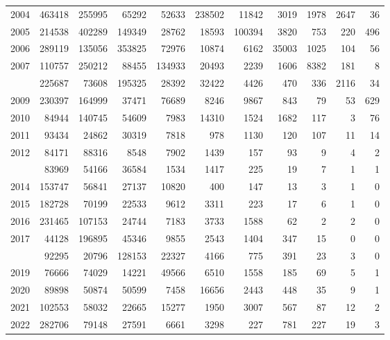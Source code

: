 \documentclass[
]{article}
\begin{document}
\begin{longtable}[t]{lrrrrrrrrrr}
2004 & 463418 & 255995 & 65292 & 52633 & 238502 & 11842 & 3019 & 1978 & 2647 & 36\\
2005 & 214538 & 402289 & 149349 & 28762 & 18593 & 100394 & 3820 & 753 & 220 & 496\\
2006 & 289119 & 135056 & 353825 & 72976 & 10874 & 6162 & 35003 & 1025 & 104 & 56\\
2007 & 110757 & 250212 & 88455 & 134933 & 20493 & 2239 & 1606 & 8382 & 181 & 8\\
\addlinespace
2008 & 225687 & 73608 & 195325 & 28392 & 32422 & 4426 & 470 & 336 & 2116 & 34\\
2009 & 230397 & 164999 & 37471 & 76689 & 8246 & 9867 & 843 & 79 & 53 & 629\\
2010 & 84944 & 140745 & 54609 & 7983 & 14310 & 1524 & 1682 & 117 & 3 & 76\\
2011 & 93434 & 24862 & 30319 & 7818 & 978 & 1130 & 120 & 107 & 11 & 14\\
2012 & 84171 & 88316 & 8548 & 7902 & 1439 & 157 & 93 & 9 & 4 & 2\\
\addlinespace
2013 & 83969 & 54166 & 36584 & 1534 & 1417 & 225 & 19 & 7 & 1 & 1\\
2014 & 153747 & 56841 & 27137 & 10820 & 400 & 147 & 13 & 3 & 1 & 0\\
2015 & 182728 & 70199 & 22533 & 9612 & 3311 & 223 & 17 & 6 & 1 & 0\\
2016 & 231465 & 107153 & 24744 & 7183 & 3733 & 1588 & 62 & 2 & 2 & 0\\
2017 & 44128 & 196895 & 45346 & 9855 & 2543 & 1404 & 347 & 15 & 0 & 0\\
\addlinespace
2018 & 92295 & 20796 & 128153 & 22327 & 4166 & 775 & 391 & 23 & 3 & 0\\
2019 & 76666 & 74029 & 14221 & 49566 & 6510 & 1558 & 185 & 69 & 5 & 1\\
2020 & 89898 & 50874 & 50599 & 7458 & 16656 & 2443 & 448 & 35 & 9 & 1\\
2021 & 102553 & 58032 & 22665 & 15277 & 1950 & 3007 & 567 & 87 & 12 & 2\\
2022 & 282706 & 79148 & 27591 & 6661 & 3298 & 227 & 781 & 227 & 19 & 3\\*
\end{longtable}
\end{document}
